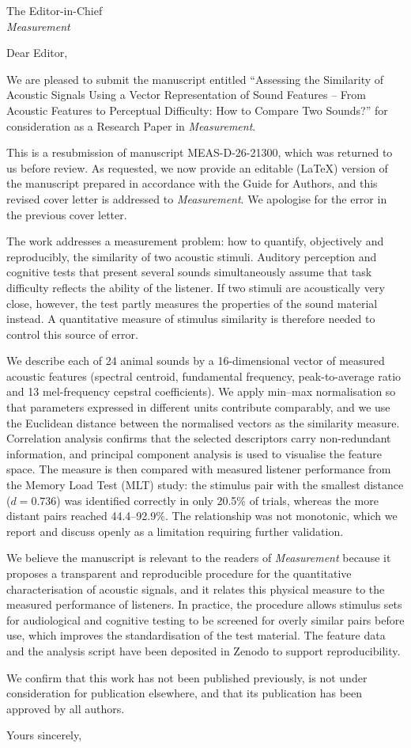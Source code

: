\documentclass[11pt]{letter}
\begin{document}
\begin{letter}{The Editor-in-Chief\\ \textit{Measurement}}

\opening{Dear Editor,}

We are pleased to submit the manuscript entitled ``Assessing the Similarity of Acoustic Signals Using a Vector Representation of Sound Features -- From Acoustic Features to Perceptual Difficulty: How to Compare Two Sounds?'' for consideration as a Research Paper in \textit{Measurement}.

This is a resubmission of manuscript MEAS-D-26-21300, which was returned to us before review. As requested, we now provide an editable (\LaTeX{}) version of the manuscript prepared in accordance with the Guide for Authors, and this revised cover letter is addressed to \textit{Measurement}. We apologise for the error in the previous cover letter.

The work addresses a measurement problem: how to quantify, objectively and reproducibly, the similarity of two acoustic stimuli. Auditory perception and cognitive tests that present several sounds simultaneously assume that task difficulty reflects the ability of the listener. If two stimuli are acoustically very close, however, the test partly measures the properties of the sound material instead. A quantitative measure of stimulus similarity is therefore needed to control this source of error.

We describe each of 24 animal sounds by a 16-dimensional vector of measured acoustic features (spectral centroid, fundamental frequency, peak-to-average ratio and 13 mel-frequency cepstral coefficients). We apply min--max normalisation so that parameters expressed in different units contribute comparably, and we use the Euclidean distance between the normalised vectors as the similarity measure. Correlation analysis confirms that the selected descriptors carry non-redundant information, and principal component analysis is used to visualise the feature space. The measure is then compared with measured listener performance from the Memory Load Test (MLT) study: the stimulus pair with the smallest distance ($d = 0.736$) was identified correctly in only 20.5\% of trials, whereas the more distant pairs reached 44.4--92.9\%. The relationship was not monotonic, which we report and discuss openly as a limitation requiring further validation.

We believe the manuscript is relevant to the readers of \textit{Measurement} because it proposes a transparent and reproducible procedure for the quantitative characterisation of acoustic signals, and it relates this physical measure to the measured performance of listeners. In practice, the procedure allows stimulus sets for audiological and cognitive testing to be screened for overly similar pairs before use, which improves the standardisation of the test material. The feature data and the analysis script have been deposited in Zenodo to support reproducibility.

We confirm that this work has not been published previously, is not under consideration for publication elsewhere, and that its publication has been approved by all authors.

\closing{Yours sincerely,}

\end{letter}
\end{document}
